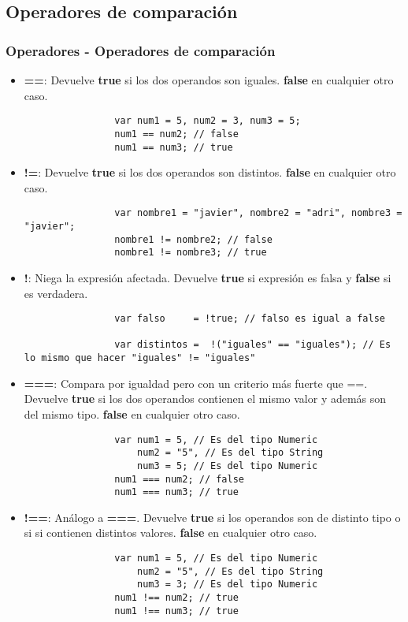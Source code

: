 \documentclass[handout, 10pt]{beamer}
\begin{document}
\subsection{Operadores de comparación}
\begin{frame}[fragile]
	\frametitle{Operadores - Operadores de comparación}
	\begin{itemize}
		\pause \item \textbf{==}: Devuelve \textbf{true} si los dos operandos son iguales. \textbf{false} en cualquier otro caso.
			\begin{lstlisting}
				var num1 = 5, num2 = 3, num3 = 5;
				num1 == num2; // false
				num1 == num3; // true
			\end{lstlisting}
			
		\pause \item \textbf{!=}: Devuelve \textbf{true} si los dos operandos son distintos. \textbf{false} en cualquier otro caso.
			\begin{lstlisting}
				var nombre1 = "javier", nombre2 = "adri", nombre3 = "javier";
				nombre1 != nombre2; // false
				nombre1 != nombre3; // true
			\end{lstlisting}
		
		\pause \item \textbf{!}: Niega la expresión afectada. Devuelve \textbf{true} si expresión es falsa y \textbf{false} si es verdadera.
			\begin{lstlisting}
				var falso     = !true; // falso es igual a false
				
				var distintos =  !("iguales" == "iguales"); // Es lo mismo que hacer "iguales" != "iguales"
			\end{lstlisting}
	\end{itemize}
\end{frame}

\begin{frame}[fragile]
	\begin{itemize}
		\pause \item \textbf{===}: Compara por igualdad pero con un criterio más fuerte que ==. Devuelve \textbf{true} si los dos
						  operandos contienen el mismo valor y además son del mismo tipo. \textbf{false} en cualquier otro caso.
			\begin{lstlisting}
				var num1 = 5, // Es del tipo Numeric
				    num2 = "5", // Es del tipo String
				    num3 = 5; // Es del tipo Numeric
				num1 === num2; // false
				num1 === num3; // true
			\end{lstlisting}
			
		\pause \item \textbf{!==}: Análogo a \textbf{===}. Devuelve \textbf{true} si los operandos son de distinto tipo o si si contienen
		             distintos valores. \textbf{false} en cualquier otro caso.
			\begin{lstlisting}
				var num1 = 5, // Es del tipo Numeric
				    num2 = "5", // Es del tipo String
				    num3 = 3; // Es del tipo Numeric
				num1 !== num2; // true
				num1 !== num3; // true
			\end{lstlisting}
	\end{itemize}
\end{frame}
\end{document}
